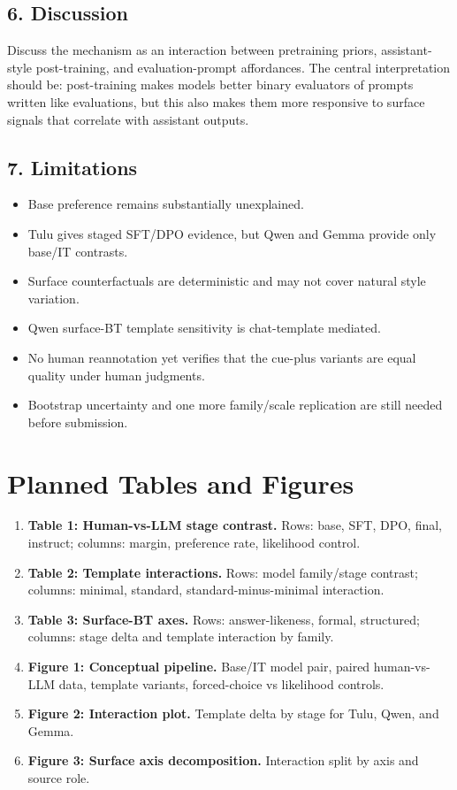 \documentclass[11pt]{article}
\begin{document}
\subsection{6. Discussion}

Discuss the mechanism as an interaction between pretraining priors,
assistant-style post-training, and evaluation-prompt affordances. The central
interpretation should be: post-training makes models better binary evaluators
of prompts written like evaluations, but this also makes them more responsive
to surface signals that correlate with assistant outputs.

\subsection{7. Limitations}

\begin{itemize}[leftmargin=1.5em]
\item Base preference remains substantially unexplained.
\item Tulu gives staged SFT/DPO evidence, but Qwen and Gemma provide only
base/IT contrasts.
\item Surface counterfactuals are deterministic and may not cover natural
style variation.
\item Qwen surface-BT template sensitivity is chat-template mediated.
\item No human reannotation yet verifies that the cue-plus variants are equal
quality under human judgments.
\item Bootstrap uncertainty and one more family/scale replication are still
needed before submission.
\end{itemize}

\section{Planned Tables and Figures}

\begin{enumerate}[leftmargin=1.5em]
\item \textbf{Table 1: Human-vs-LLM stage contrast.} Rows: base, SFT, DPO,
final, instruct; columns: margin, preference rate, likelihood control.
\item \textbf{Table 2: Template interactions.} Rows: model family/stage
contrast; columns: minimal, standard, standard-minus-minimal interaction.
\item \textbf{Table 3: Surface-BT axes.} Rows: answer-likeness, formal,
structured; columns: stage delta and template interaction by family.
\item \textbf{Figure 1: Conceptual pipeline.} Base/IT model pair, paired
human-vs-LLM data, template variants, forced-choice vs likelihood controls.
\item \textbf{Figure 2: Interaction plot.} Template delta by stage for Tulu,
Qwen, and Gemma.
\item \textbf{Figure 3: Surface axis decomposition.} Interaction split by
axis and source role.
\end{enumerate}
\end{document}
